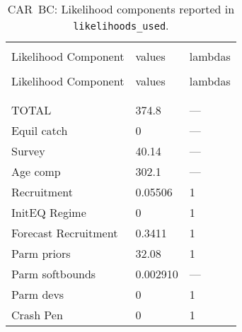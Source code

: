 \clearpage

\setlength{\tabcolsep}{0pt}
\begin{longtable}[c]{>{\raggedright\let\newline\\\arraybackslash\hspace{0pt}}p{2.31in}>{\raggedleft\let\newline\\\arraybackslash\hspace{0pt}}p{1.35in}>{\raggedleft\let\newline\\\arraybackslash\hspace{0pt}}p{1.35in}}
  \caption{CAR~BC: Likelihood components reported in \texttt{likelihoods\_used}.} \label{tab:car.like1}\\  \hline\\[-2.2ex]  Likelihood Component  & values & lambdas \\[0.2ex]\hline\\[-1.5ex]  \endfirsthead   \hline  Likelihood Component  & values & lambdas \\[0.2ex]\hline\\[-1.5ex]  \endhead  \hline\\[-2.2ex]   \endfoot  \hline \endlastfoot  TOTAL & 374.8 & --- \\ 
  Equil catch & 0 & --- \\ 
  Survey & 40.14 & --- \\ 
  Age comp & 302.1 & --- \\ 
  Recruitment & 0.05506 & 1 \\ 
  InitEQ Regime & 0 & 1 \\ 
  Forecast Recruitment & 0.3411 & 1 \\ 
  Parm priors & 32.08 & 1 \\ 
  Parm softbounds & 0.002910 & --- \\ 
  Parm devs & 0 & 1 \\ 
  Crash Pen & 0 & 1 \\ 
\end{longtable}\setlength{\tabcolsep}{0pt}

